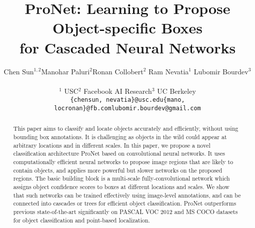 \documentclass[10pt,twocolumn,letterpaper]{article}
\begin{document}
\title{ProNet: Learning to Propose Object-specific Boxes\\ for Cascaded Neural Networks}

\author{Chen Sun$^{1,2}$\quad Manohar Paluri$^2$\quad Ronan Collobert$^2$
       \quad Ram Nevatia$^1$ \quad Lubomir Bourdev$^3$
       \\
       \begin{tabular}{ccc}
       $^1$ USC & $^2$ Facebook AI Research & $^3$ UC Berkeley\\
        {\tt\small\{chensun, nevatia\}@usc.edu} & {\tt\small\{mano, locronan\}@fb.com} & {\tt\small lubomir.bourdev@gmail.com}
       \end{tabular}
       }

\maketitle

\begin{abstract}
This paper aims to classify and locate objects accurately and efficiently, without using bounding box annotations. It is challenging as objects in the wild could appear at arbitrary locations and in different scales. 
In this paper, we propose a novel classification architecture ProNet based on convolutional neural networks. 
It uses computationally efficient neural networks to propose image regions that are likely to contain objects, and applies more powerful but slower networks on the proposed regions. The basic building block is a multi-scale fully-convolutional network which assigns object confidence scores to boxes at different locations and scales. We show that such networks can be trained effectively using image-level annotations, and can be connected into cascades or trees for efficient object classification. ProNet outperforms previous state-of-the-art significantly on PASCAL VOC 2012 and MS COCO datasets for object classification and point-based localization.
\end{abstract}
\end{document}
